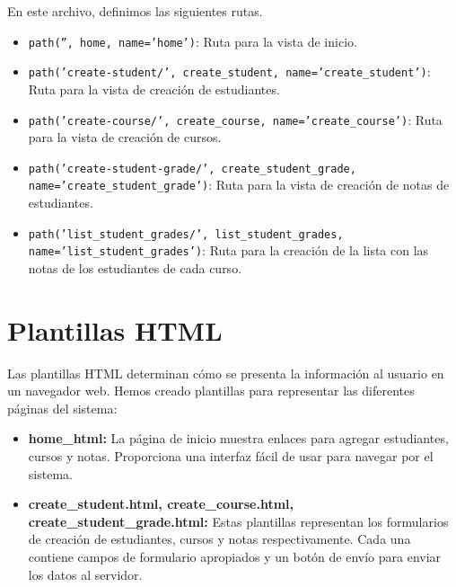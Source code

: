 \documentclass[10pt, a4paper]{article}
\newcommand{\mpy}[1]{\texttt{#1}}
\begin{document}
En este archivo, definimos las siguientes rutas.

\begin{itemize}
  \item \mpy{path('', home, name='home')}: Ruta para la vista de inicio.
  \item \mpy{path('create-student/', create_student, name='create_student')}: Ruta para la vista de creación de estudiantes.
  \item \mpy{path('create-course/', create_course, name='create_course')}: Ruta para la vista de creación de cursos.
  \item \mpy{path('create-student-grade/', create_student_grade, name='create_student_grade')}: Ruta para la vista de creación de notas de estudiantes.
  \item \mpy{path('list_student_grades/', list_student_grades, name='list_student_grades')}: Ruta para la creación de la lista con las notas de los estudiantes de cada curso.
\end{itemize}

\section{Plantillas HTML}
Las plantillas HTML determinan cómo se presenta la información al usuario en un navegador web. Hemos creado plantillas para representar las diferentes páginas del sistema:

\begin{itemize}
  \item \textbf{home\_html:} La página de inicio muestra enlaces para agregar estudiantes, cursos y notas. Proporciona una interfaz fácil de usar para navegar por el sistema.

  \item \textbf{create\_student.html, create\_course.html, create\_student\_grade.html:} Estas plantillas representan los formularios de creación de estudiantes, cursos y notas respectivamente. Cada una contiene campos de formulario apropiados y un botón de envío para enviar los datos al servidor.
\end{itemize}
\end{document}
